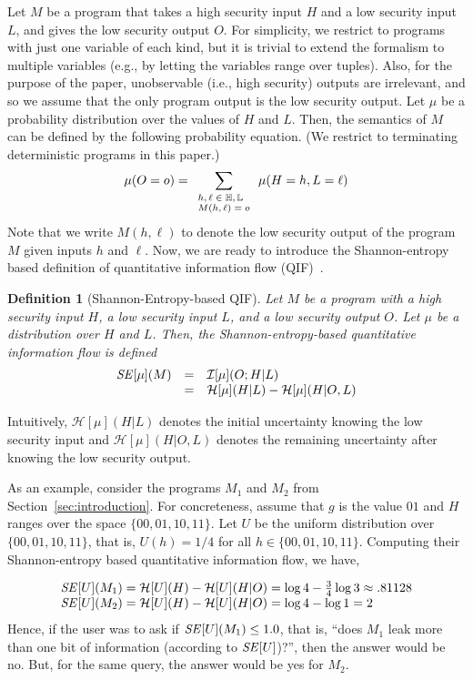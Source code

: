 \documentclass{llncs}
\newtheorem{definition}[theorem]{Definition}
\newcommand{\aset}[1]{\{{#1}\}}
\begin{document}
Let $M$ be a program that takes a high security input $H$ and a low
security input $L$, and gives the low security output $O$.  For
simplicity, we restrict to programs with just one variable of each
kind, but it is trivial to extend the formalism to multiple variables
(e.g., by letting the variables range over tuples).  Also, for the
purpose of the paper, unobservable (i.e., high security) outputs are
irrelevant, and so we assume that the only program output is the low
security output.  Let $\mu$ be a probability distribution over the
values of $H$ and $L$.  Then, the semantics of $M$ can be defined by
the following probability equation. (We restrict to terminating
  deterministic programs in this paper.)
\[
\mu(O = o) = \sum_{\scriptsize \begin{array}{l}h,\ell \in \mathbb{H}, \mathbb{L}\\ M(h,\ell) = o\end{array}} \mu(H = h, L = \ell)
\]
Note that we write $M(h,\ell)$ to denote the low security output of
the program $M$ given inputs $h$ and $\ell$.  Now, we are ready to
introduce the Shannon-entropy based definition of quantitative
information flow (QIF)~\cite{denning82,clarkjcs2007,malacaria:popl2007}.
\begin{definition}[Shannon-Entropy-based QIF]
\label{def:se}
Let $M$ be a program with a high security input $H$, a low security input
$L$, and a low security output $O$.  Let $\mu$ be a distribution over
$H$ and $L$.  Then, the Shannon-entropy-based quantitative information
flow is defined
\[
\begin{array}{rcl}
{\it SE}[\mu](M) & = & \mathcal{I}[\mu](O;H|L) \\
 & = & \mathcal{H}[\mu](H|L)-\mathcal{H}[\mu](H|O,L)
\end{array}
\]
\end{definition}
Intuitively, $\mathcal{H}[\mu](H|L)$ denotes the initial uncertainty
knowing the low security input and $\mathcal{H}[\mu](H|O,L)$ denotes
the remaining uncertainty after knowing the low security output.

\begin{sloppypar}
As an example, consider the programs $M_1$ and $M_2$ from
Section~\ref{sec:introduction}.  For concreteness, assume that $g$ is
the value $01$ and $H$ ranges over the space $\aset{00,01,10,11}$.
Let $U$ be the uniform distribution over $\aset{00,01,10,11}$, that
is, $U(h) = 1/4$ for all $h \in \aset{00,01,10,11}$.  Computing
their Shannon-entropy based quantitative information flow, we have,
\end{sloppypar}
\[
\begin{array}{l}
{\it SE}[U](M_1)=\mathcal{H}[U](H)-\mathcal{H}[U](H|O)
=\log 4-\frac{3}{4}\log{3}
\approx .81128\\

{\it SE}[U](M_2)=\mathcal{H}[U](H)-\mathcal{H}[U](H|O)
=\log 4-\log 1
=2
\end{array}
\]
Hence, if the user was to ask if ${\it SE}[U](M_1) \leq 1.0$, that is,
``does $M_1$ leak more than one bit of information (according to ${\it
SE}[U]$)?'', then the answer would be no.  But, for the same query,
the answer would be yes for $M_2$.
\end{document}
